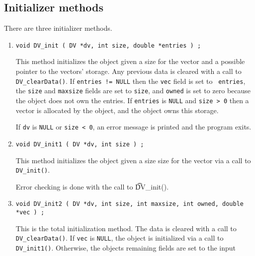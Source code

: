 \subsection{Initializer methods}
\label{subsection:DV:proto:initializers}
\par
There are three initializer methods.
\par
\begin{enumerate}
\item
\begin{verbatim}
void DV_init ( DV *dv, int size, double *entries ) ;
\end{verbatim}
This method initializes the object given a size for the vector
and a possible pointer to the vectors' storage.
Any previous data is cleared with a call to {\tt DV\_clearData()}.
If {\tt entries != NULL} then the {\tt vec} field is set to {\tt
entries}, the {\tt size} and {\tt maxsize} fields are set to 
{\tt size}, and {\tt owned} is set to zero
because the object does not own the entries.
If {\tt entries} is {\tt NULL} and {\tt size > 0} then a vector 
is allocated by the object, and the object owns this storage.
\par {}
If {\tt dv} is {\tt NULL} or {\tt size < 0},
an error message is printed and the program exits.
\item
\begin{verbatim}
void DV_init1 ( DV *dv, int size ) ;
\end{verbatim}
This method initializes the object given a size size for the vector
via a call to {\tt DV\_init()}.
\par {}
Error checking is done with the call to {\t DV\_init()}.
\item
\begin{verbatim}
void DV_init2 ( DV *dv, int size, int maxsize, int owned, double *vec ) ;
\end{verbatim}
This is the total initialization method.
The data is cleared with a call to {\tt DV\_clearData()}.
If {\tt vec} is {\tt NULL}, the object is initialized via a call
to {\tt DV\_init1()}.
Otherwise, the objects remaining fields are set to the input

\end{enumerate}
